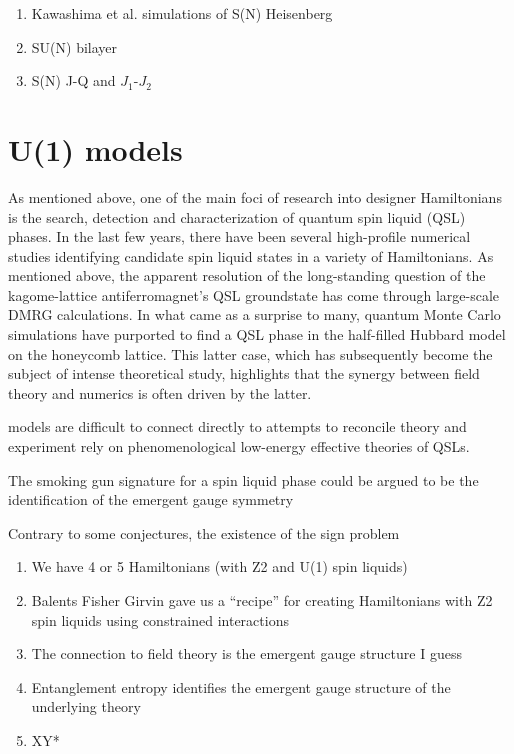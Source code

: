 \documentclass[aps,prb,groupedaddress, twocolumn]{revtex4}
\begin{document}
\begin{enumerate}
\item Kawashima et al. simulations of S(N) Heisenberg
\item SU(N) bilayer
\item S(N) J-Q and $J_1$-$J_2$
\end{enumerate}

\section{U(1) models}

As mentioned above, one of the main foci of research into designer Hamiltonians is the search, detection and characterization of quantum spin liquid (QSL) phases.  In the last few years, there have been several high-profile numerical studies identifying candidate spin liquid states in a variety of Hamiltonians.  As mentioned above, the apparent resolution of the long-standing question of the kagome-lattice antiferromagnet's QSL groundstate has come through large-scale DMRG calculations.  In what came as a surprise to many, quantum Monte Carlo simulations have purported to find a QSL phase in the half-filled Hubbard model on the honeycomb lattice.  This latter case, which has subsequently become the subject of intense theoretical study, highlights that the synergy between field theory and numerics is often driven by the latter.

models are difficult to connect directly to 
attempts to reconcile theory and experiment rely on phenomenological low-energy effective theories of QSLs.

The smoking gun signature for a spin liquid phase could be argued to be the identification of the emergent gauge symmetry

Contrary to some conjectures, the existence of the sign problem 

\begin{enumerate}
\item We have 4 or 5 Hamiltonians (with Z2 and U(1) spin liquids)
\item Balents Fisher Girvin gave us a ``recipe'' for creating Hamiltonians with Z2 spin liquids using constrained interactions
\item The connection to field theory is the emergent gauge structure I guess
\item Entanglement entropy identifies the emergent gauge structure of the underlying theory
\item XY*
\end{enumerate}
\end{document}
